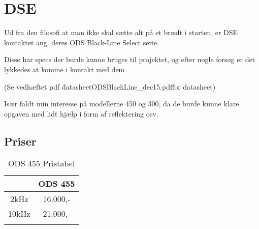 \section{DSE}
Ud fra den filosofi at man ikke skal sætte alt på et brædt i starten, er DSE kontaktet ang. deres ODS Black-Line Select serie.

Disse har specs der burde kunne bruges til projektet, og efter nogle forsøg er det lykkedes at komme i kontakt med dem

(Se vedhæftet pdf \"datasheetODS\-Black\-Line\_dec15.pdf\" for datasheet)

Især faldt min interesse på modellerne 450 og 300, da de burde kunne klare opgaven med lidt hjælp i form af reflektering osv.

\subsection{Priser}

\begin{table}[h]
\centering
\label{my-label}
\begin{tabular}{cc}
\hline
      & ODS 455  \\ \hline
2kHz  & 16.000,- \\
10kHz & 21.000,- \\ \hline
\caption{ODS 455 Pristabel}
\end{tabular}
\end{table}

